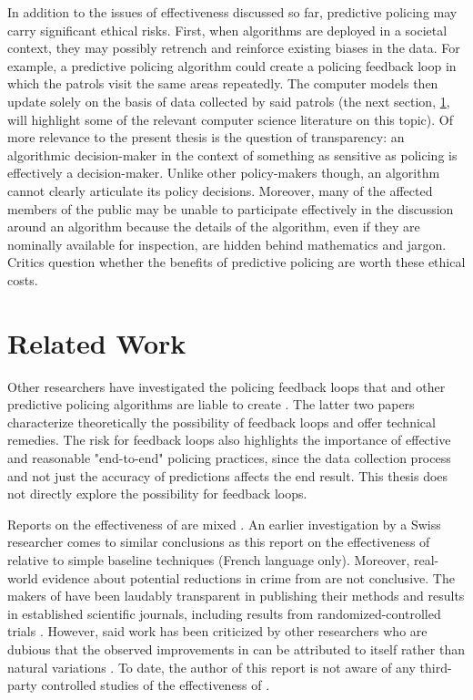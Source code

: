 In addition to the issues of effectiveness discussed so far, predictive policing may carry significant ethical risks. First, when algorithms are deployed in a societal context, they may possibly retrench and reinforce existing biases in the data. For example, a predictive policing algorithm could create a policing feedback loop in which the patrols visit the same areas repeatedly. The computer models then update solely on the basis of data collected by said patrols (the next section, \ref{sec:related_work}, will highlight some of the relevant computer science literature on this topic). Of more relevance to the present thesis is the question of transparency: an algorithmic decision-maker in the context of something as sensitive as policing is effectively a decision-maker. Unlike other policy-makers though, an algorithm cannot clearly articulate its policy decisions. Moreover, many of the affected members of the public may be unable to participate effectively in the discussion around an algorithm because the details of the algorithm, even if they are nominally available for inspection, are hidden behind mathematics and jargon. Critics question whether the benefits of predictive policing are worth these ethical costs.

\section{Related Work} \label{sec:related_work}
Other researchers have investigated the policing feedback loops that \pp and other predictive policing algorithms are liable to create \citep{lum_predict_2016,ensign_runaway_2017,ensign_decision_2018}. The latter two papers characterize theoretically the possibility of feedback loops and offer technical remedies. The risk for feedback loops also highlights the importance of effective and reasonable "end-to-end" policing practices, since the data collection process and not just the accuracy of predictions affects the end result. This thesis does not directly explore the possibility for feedback loops.

Reports on the effectiveness of \pp are mixed \citep{robinson_stuck_2016}. An earlier investigation by a Swiss researcher comes to similar conclusions as this report on the effectiveness of \pp relative to simple baseline techniques \citep{benslimane_etude_2014} (French language only). Moreover, real-world evidence about potential reductions in crime from \pp are not conclusive. The makers of \pp have been laudably transparent in publishing their methods and results in established scientific journals, including results from randomized-controlled trials \citep{mohler_self-exciting_2011,mohler_marked_2014,mohler_randomized_2015}. However, said work has been criticized by other researchers who are dubious that the observed improvements in \pp can be attributed to \pp itself rather than natural variations \citep{saunders_predictions_2016}. To date, the author of this report is not aware of any third-party controlled studies of the effectiveness of \pp.

